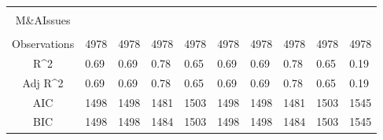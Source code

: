\documentclass{article}
\begin{document}
\begin{table}[H]
\begin{tabular}{|clllllllll|}
   &  &  &  &  &  &  &  &  &  \\ 
  M\&AIssues &  &  &  &  &  &  &  &  &  \\ 
   &  &  &  &  &  &  &  &  &  \\ 
  \hline 
 Observations & 4978 & 4978 & 4978 & 4978 & 4978 & 4978 & 4978 & 4978 & 4978 \\ 
  R^2 & 0.69 & 0.69 & 0.78 & 0.65 & 0.69 & 0.69 & 0.78 & 0.65 & 0.19 \\ 
  Adj R^2 & 0.69 & 0.69 & 0.78 & 0.65 & 0.69 & 0.69 & 0.78 & 0.65 & 0.19 \\ 
  AIC & 1498 & 1498 & 1481 & 1503 & 1498 & 1498 & 1481 & 1503 & 1545 \\ 
  BIC & 1498 & 1498 & 1484 & 1503 & 1498 & 1498 & 1484 & 1503 & 1545 \\ 
   \hline
\end{tabular}
 
\end{table}
\end{document}
